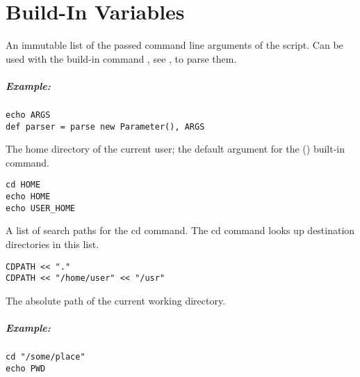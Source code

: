 \section{Build-In Variables}
 
\label{par:args}

An immutable list of the passed command line arguments of the script.
Can be used with the build-in command , see ,
to parse them.

\subparagraph{Example:}

\begin{lstlisting}[style=Groovybash, label={lst:example_args_echo}]
echo ARGS
def parser = parse new Parameter(), ARGS
\end{lstlisting}

\label{par:user_home}

The home directory of the current user; the default argument for
the  () built-in command.

\begin{lstlisting}[style=Groovybash, label={lst:example_user_home}]
cd HOME
echo HOME
echo USER_HOME
\end{lstlisting}

\label{par:cdpath}

A list of search paths for the cd command.
The cd command looks up destination directories in this list.

\begin{lstlisting}[style=Groovybash, label={lst:example_cdpath}]
CDPATH << "."
CDPATH << "/home/user" << "/usr"
\end{lstlisting}


\label{par:variable_pwd}

The absolute path of the current working directory.

\subparagraph{Example:}

\begin{lstlisting}[style=Groovybash, label={lst:example_variable_pwd}]
cd "/some/place"
echo PWD
\end{lstlisting}

